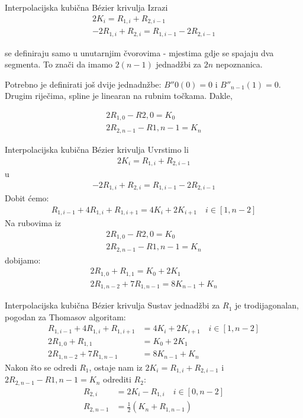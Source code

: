 \documentclass[9pt]{beamer}
\begin{document}
\begin{frame}{Interpolacijska kubična B\'{e}zier krivulja}
	Izrazi 
	\begin{align*}
	2K_i = R_{1, i}  + R_{2, i-1} \\
	-2R_{1,i} + R_{2, i} = R_{1, i-1} - 2R_{2, i-1}
	\end{align*}
	
	se definiraju samo u unutarnjim čvorovima - mjestima gdje se spajaju dva segmenta. To znači da imamo $2(n-1)$ jednadžbi za $2n$ nepoznanica.
	
	Potrebno je definirati još dvije jednadnžbe:  
	$B''0(0)=0$ i  $B''_{n-1}(1)=0$. Drugim riječima, spline je linearan na rubnim točkama. Dakle,
	
	\begin{align*}
	2R_{1, 0} - R{2, 0}=K_0 \\
	2R_{2, n-1} - R{1, n-1}=K_n
	\end{align*}
\end{frame}

\begin{frame}{Interpolacijska kubična B\'{e}zier krivulja}
	Uvrstimo li 
	\begin{align*}
	2K_i = R_{1, i}  + R_{2, i-1} 
	\end{align*}
	u 
	\begin{align*}
	-2R_{1,i} + R_{2, i} = R_{1, i-1} - 2R_{2, i-1}
	\end{align*}
	Dobit ćemo:
	\begin{align*}
	R_{1,i-1} + 4R_{1, i}  + R_{1, i+1}= 4K_i + 2K_{i+1} \quad i \in \left[ 1, n-2\right]
	\end{align*}
	Na rubovima iz 
	\begin{align*}
	2R_{1, 0} - R{2, 0}=K_0 \\
	2R_{2, n-1} - R{1, n-1}=K_n
	\end{align*} 
	dobijamo:
	\begin{align*}
	2R_{1, 0} + R_{1, 1}=K_0 + 2K_1 \\
	2R_{1, n-2} + 7R_{1, n-1} = 8K_{n-1} + K_{n}
	\end{align*} 
\end{frame}

\begin{frame}{Interpolacijska kubična B\'{e}zier krivulja}
	Sustav jednadžbi za $R_1$ je trodijagonalan, pogodan za Thomasov algoritam:
	\begin{align*}
	R_{1,i-1} + 4R_{1, i}  + R_{1, i+1}&= 4K_i + 2K_{i+1} \quad i \in \left[ 1, n-2\right] \\
	2R_{1, 0} + R_{1, 1}&=K_0 + 2K_1 \\
	2R_{1, n-2} + 7R_{1, n-1} &= 8K_{n-1} + K_{n}
	\end{align*}
	Nakon što se odredi  $R_1$,
	ostaje nam iz $2K_i = R_{1, i}  + R_{2, i-1}$ i $2R_{2, n-1} - R{1, n-1}=K_n$ odrediti $R_2$:
	\begin{align*}
	R_{2,i} &= 2K_i - R_{1, i} \quad i \in \left[ 0, n-2\right] \\
	R_{2, n-1} &= \frac{1}{2}(K_n + R_{1, n-1})
	\end{align*}
\end{frame}
\end{document}
